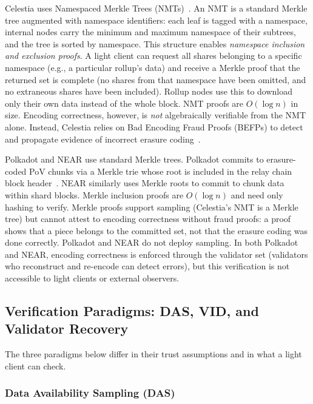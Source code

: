 Celestia uses Namespaced Merkle Trees (NMTs)~\cite{AlBassam_LazyLedger}.
An NMT is a standard Merkle tree augmented with namespace identifiers: each leaf is tagged with a namespace, internal nodes carry the minimum and maximum namespace of their subtrees, and the tree is sorted by namespace.
This structure enables \emph{namespace inclusion and exclusion proofs}. A light client can request all shares belonging to a specific namespace (e.g., a particular rollup's data) and receive a Merkle proof that the returned set is complete (no shares from that namespace have been omitted, and no extraneous shares have been included).
Rollup nodes use this to download only their own data instead of the whole block.
NMT proofs are $O(\log n)$ in size.
Encoding correctness, however, is \emph{not} algebraically verifiable from the NMT alone. Instead, Celestia relies on Bad Encoding Fraud Proofs (BEFPs) to detect and propagate evidence of incorrect erasure coding~\cite{AlBassam_FraudDA}.

Polkadot and NEAR use standard Merkle trees.
Polkadot commits to erasure-coded PoV chunks via a Merkle trie whose root is included in the relay chain block header~\cite{Overview_of_polkadot, polkadot_article}.
NEAR similarly uses Merkle roots to commit to chunk data within shard blocks.
Merkle inclusion proofs are $O(\log n)$ and need only hashing to verify.
Merkle proofs support sampling (Celestia's NMT is a Merkle tree) but cannot attest to encoding correctness without fraud proofs: a proof shows that a piece belongs to the committed set, not that the erasure coding was done correctly. Polkadot and NEAR do not deploy sampling.
In both Polkadot and NEAR, encoding correctness is enforced through the validator set (validators who reconstruct and re-encode can detect errors), but this verification is not accessible to light clients or external observers.

\subsection{Verification Paradigms: DAS, VID, and Validator Recovery}
\label{subsec:verification}

The three paradigms below differ in their trust assumptions and in what a light client can check.

\subsubsection{Data Availability Sampling (DAS)}

